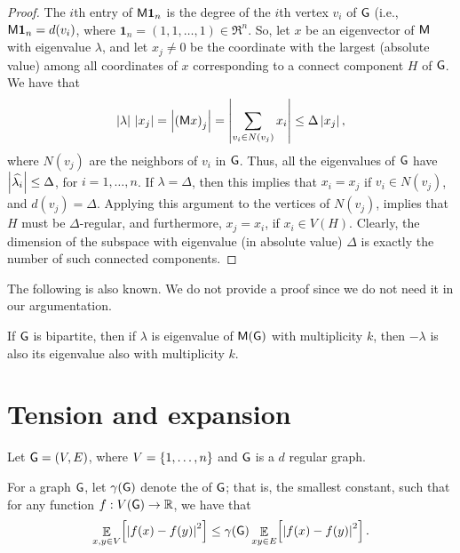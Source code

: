 \begin{proof}
    The $i$th entry of $\mathsf{M} \mathbf{1}_n$ is the degree of the $i$th
    vertex $v_i$ of $\mathsf{G}$ (i.e., $\mathsf{M} \mathbf{1}_n=d(v_i)$, where
    $\mathbf{1}_n =(1,1,\ldots, 1) \in \Re^n$.
    So, let $x$ be an eigenvector of $\mathsf{M}$ with eigenvalue
    $\lambda$, and let $x_j\ne 0$ be the coordinate with the largest
    (absolute value) among all coordinates of $x$ corresponding to a
    connect component $H$ of $\mathsf{G}$. We have that
    \[
    \cardin{\lambda} \, \cardin{x_j} 
    = \cardin{\pth{\Mtrx x}_j} = \cardin{\sum_{v_i \in N(v_j)} x_i}
    \leq \Delta \cardin{x_j}, 
    \]
    where $N(v_j)$ are the neighbors of $v_i$ in $\mathsf{G}$. Thus, all
    the eigenvalues of $\mathsf{G}$ have $\left| {\widehat{\lambda_{i}}} \right| \leq \Delta$,
    for $i=1,\ldots, n$. If $\lambda=\Delta$, then this implies that
    $x_i = x_j$ if $v_i \in N(v_j)$, and $d(v_j) = \Delta$. Applying
    this argument to the vertices of $N(v_j)$, implies that $H$ must
    be $\Delta$-regular, and furthermore, $x_j=x_i$, if $x_i \in
    V(H)$. Clearly, the dimension of the subspace with eigenvalue (in
    absolute value) $\Delta$ is exactly the number of such connected
    components.
\end{proof}

The following is also known. We do not provide a proof since we do not
need it in our argumentation.

\begin{lemma}
    If $\mathsf{G}$ is bipartite, then if $\lambda$ is eigenvalue of
    $\mathsf{M}(\mathsf{G})$ with multiplicity $k$, then $-\lambda$ is also its
    eigenvalue also with multiplicity $k$.
\end{lemma}

\section{Tension and expansion}

Let $\mathsf{G}=(V,E)$, where $V = \left\{ {1,\ldots, n} \right\}$ and $\mathsf{G}$ is a
$d$ regular graph.



\begin{defn}
    For a graph $\mathsf{G}$, let $\DialX{\Graph}$ denote the
     of $\mathsf{G}$; that is, the smallest constant, such
    that for any function $f:V(\mathsf{G}) \rightarrow \mathbb{R}$, we have that
    \begin{align}
        \ExExt{x,y \in V}{\cardin{f(x)- f(y)}^2} \leq
        \DialX{\Graph} \ExExt{ xy \in E}{\cardin{f(x)- f(y)}^2}.
        \eqlab{tension}
    \end{align}
\end{defn}

